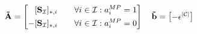 \begin{equation*}
    \bold{\tilde{A}} = 
    \left[\begin{aligned}
        & [\mathbf S_{\mathcal{I}}]_{*,i} \quad &\forall i \in \mathcal{I}: a_i^{MP} = 1\\
        - & [\mathbf S_{\mathcal{I}}]_{*,i} \quad &\forall i \in \mathcal{I}: a_i^{MP} = 0\\
    \end{aligned}\right]  
    \quad \bold{\tilde{b}} = \left[\begin{aligned}
        -&\epsilon^{|\mathcal{C}|} \\
    \end{aligned}\right]
\end{equation*} 




